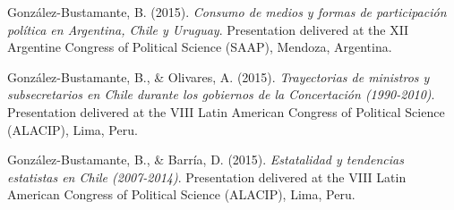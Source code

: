 \begin{publications}
\begin{benumerate}{87}

\item{González-Bustamante, B. (2015). {\itshape Consumo de medios y formas de participación política en Argentina, Chile y Uruguay}. Presentation delivered at the XII Argentine Congress of Political Science (SAAP), Mendoza, Argentina.}\vspace{1mm}


\item{González-Bustamante, B., \& Olivares, A. (2015). {\itshape Trayectorias de ministros y subsecretarios en Chile durante los gobiernos de la Concertación (1990-2010)}. Presentation delivered at the VIII Latin American Congress of Political Science (ALACIP), Lima, Peru.}\vspace{1mm}


\item{González-Bustamante, B., \& Barría, D. (2015). {\itshape Estatalidad y tendencias estatistas en Chile (2007-2014)}. Presentation delivered at the VIII Latin American Congress of Political Science (ALACIP), Lima, Peru.}\vspace{1mm}



\end{benumerate}
\end{publications}
